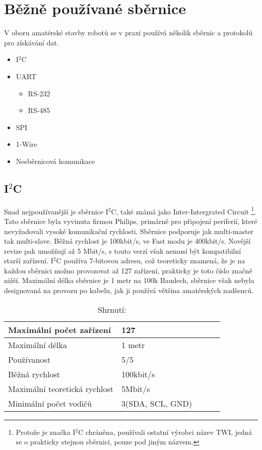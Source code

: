 \chapter{Běžně používané sběrnice}
V oboru amatérské stavby robotů se v praxi používá několik sběrnic a protokolů pro získávání dat.
\begin{itemize}
	\item I$^{2}$C 
	\item UART
		\begin{itemize}
			\item RS-232
			\item RS-485
		\end{itemize}
	\item SPI
	\item 1-Wire
	\item Nesběrnicová komunikace
\end{itemize}

\section{I$^{2}$C}
Snad nejpoužívanější je sběrnice I$^{2}$C,
také známá jako Inter-Intergrated Circuit
\footnote{ Protože je značka I$^{2}$C chráněna, používali ostatní výrobci název TWI, jedná se o prakticky stejnou sběrnici, pouze pod jiným názvem.}.
Tato sběrnice byla vyvinuta firmou Philips, primárně pro připojení periferií, které nevyžadovali vysoké komunikační rychlosti.
Sběrnice podporuje jak multi-master tak multi-slave.
Běžná rychlost je 100kbit/s, ve Fast modu je 400kbit/s. Novější revize pak umožňují až 5 Mbit/s, s touto verzí však nemusí být kompatibilní starší zařízení.
I$^{2}$C používa 7-bitovou adresu, což teoreticky znamená, že je na každou sběrnici možno provozovat až 127 zařízení, prakticky je toto číslo značně nižší.
Maximální délka sběrnice je 1 metr na 100k Baudech, sběrnice však nebyla designovaná na provozu po kabelu, jak ji používá většina amatérských nadšenců.\cite{https://www.nxp.com/docs/en/user-guide/UM10204.pdf}

\begin{table}[]
	\caption{Shrnutí:}
	\centering
	\begin{tabular}{|l|l|l|l|l|} \hline
		Maximální počet zařízení & 127   \\ \hline
		Maximální délka & 1 metr  \\ \hline
		Používanost & 5/5   \\ \hline
		Běžná rychlost & 100kbit/s \\ \hline
		Maximální teoretická rychlost &  5Mbit/s  \\ \hline
		Minimální počet vodičů & 3(SDA, SCL, GND) \\ \hline
	\end{tabular}
\end{table}



